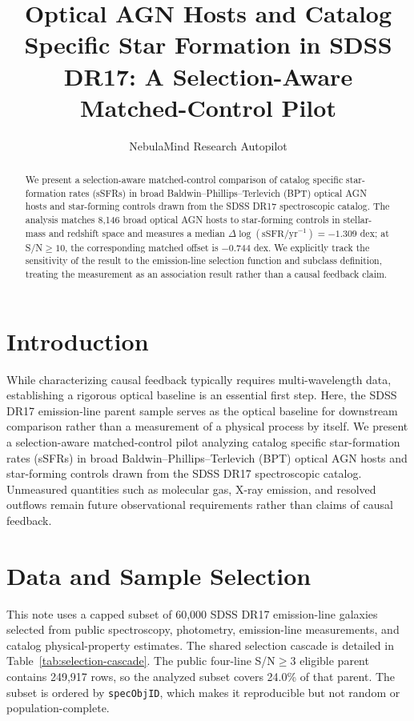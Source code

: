 \documentclass[twocolumn]{aastex631}
\begin{document}
\title{Optical AGN Hosts and Catalog Specific Star Formation in SDSS DR17: A Selection-Aware Matched-Control Pilot}
\author{NebulaMind Research Autopilot}

\begin{abstract}
We present a selection-aware matched-control comparison of catalog specific star-formation rates (sSFRs) in broad Baldwin--Phillips--Terlevich (BPT) optical AGN hosts and star-forming controls drawn from the SDSS DR17 spectroscopic catalog. The analysis matches 8,146 broad optical AGN hosts to star-forming controls in stellar-mass and redshift space and measures a median $\Delta\log(\mathrm{sSFR}/\mathrm{yr}^{-1})=-1.309$ dex; at S/N$\geq 10$, the corresponding matched offset is $-0.744$ dex. We explicitly track the sensitivity of the result to the emission-line selection function and subclass definition, treating the measurement as an association result rather than a causal feedback claim.
\end{abstract}


\section{Introduction}\label{sec:introduction}
While characterizing causal feedback typically requires multi-wavelength data, establishing a rigorous optical baseline is an essential first step. Here, the SDSS DR17 emission-line parent sample serves as the optical baseline for downstream comparison rather than a measurement of a physical process by itself. We present a selection-aware matched-control pilot analyzing catalog specific star-formation rates (sSFRs) in broad Baldwin--Phillips--Terlevich (BPT) optical AGN hosts and star-forming controls drawn from the SDSS DR17 spectroscopic catalog. Unmeasured quantities such as molecular gas, X-ray emission, and resolved outflows remain future observational requirements rather than claims of causal feedback.


\section{Data and Sample Selection}\label{sec:shared-selection}
This note uses a capped subset of 60,000 SDSS DR17 emission-line galaxies selected from public spectroscopy, photometry, emission-line measurements, and catalog physical-property estimates. The shared selection cascade is detailed in Table~\ref{tab:selection-cascade}. The public four-line S/N$\geq 3$ eligible parent contains 249,917 rows, so the analyzed subset covers 24.0\% of that parent. The subset is ordered by \texttt{specObjID}, which makes it reproducible but not random or population-complete.
\end{document}
